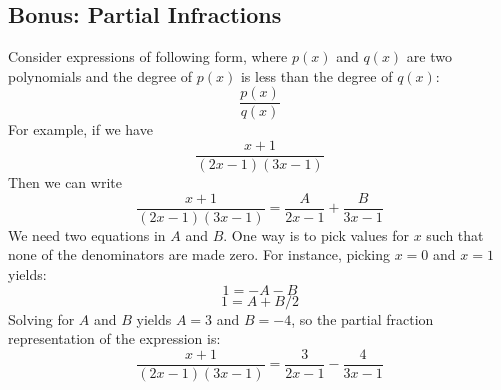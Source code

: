 \documentclass[10pt,twocolumn]{article}
\begin{document}
	\subsection*{Bonus: Partial Infractions}
	
	Consider expressions of following form, where $p(x)$ and $q(x)$ are two polynomials and the degree of $p(x)$ is less than the degree of $q(x)$:
	\[\frac{p(x)}{q(x)}\]
	For example, if we have
	\[\frac{x+1}{(2x-1)(3x-1)}\]
	Then we can write
	\[\frac{x+1}{(2x-1)(3x-1)}=\frac{A}{2x-1}+\frac{B}{3x-1}\]
	We need two equations in $A$ and $B$. One way is to pick values for $x$ such that none of the denominators are made zero. For instance, picking $x=0$ and $x=1$ yields:
	\[1=-A-B\]
	\[1=A+B/2\]
	Solving for $A$ and $B$ yields $A=3$ and $B=-4$, so the partial fraction representation of the expression is:
	\[\frac{x+1}{(2x-1)(3x-1)}=\frac{3}{2x-1}-\frac{4}{3x-1}\]
\end{document}
